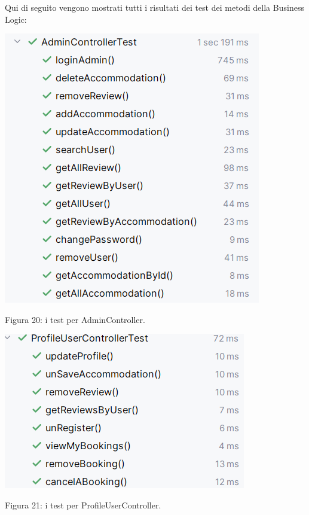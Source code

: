 \documentclass[10pt]{article}
\begin{document}
Qui di seguito vengono mostrati tutti i risultati dei test dei metodi della Business Logic:
\par\medskip
\begin{center}
\includegraphics[scale=0.55]{test/BusinessLogic/testAdminController}
\par\medskip
Figura 20: i test per AdminController.
\par\medskip
\end{center}
\begin{center}
\includegraphics[scale=0.55]{test/BusinessLogic/testProfileUserController}
\par\medskip
Figura 21: i test per ProfileUserController.
\par\medskip
\end{center}
\end{document}
